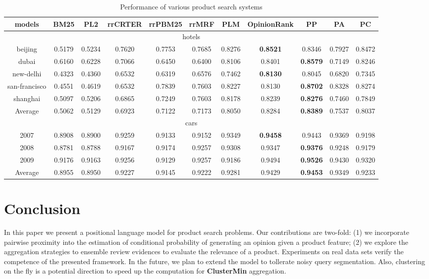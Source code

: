 \documentclass[preprint]{elsarticle}
\begin{document}
\begin{table}
\tiny
\begin{tabular}{|c|c|c|c|c|c|c|c|c|c|c|}
\hline
models &	BM25	&PL2	&rrCRTER	&rrPBM25	&rrMRF	&PLM	&OpinionRank	&PP	&PA	&PC\\\hline
\multicolumn{11}{|c|}{hotels}\\\hline										
beijing &	0.5179 &	0.5234	& 0.7620	& 0.7753	& 0.7685	& 0.8276	& \textbf{0.8521} &	0.8346 &	0.7927 &	0.8472 \\\hline
dubai	& 0.6160	& 0.6228	& 0.7066& 	0.6450	& 0.6400	& 0.8106	& 0.8401& 	\textbf{0.8579}& 	0.7149& 	0.8246\\\hline
new-delhi& 	0.4323& 	0.4360& 	0.6532& 	0.6319& 	0.6576& 	0.7462& 	\textbf{0.8130}& 	0.8045& 	0.6820	& 0.7345\\\hline
san-francisco& 	0.4551	& 0.4619& 	0.6532& 	0.7839	& 0.7603	& 0.8227& 	0.8130	& \textbf{0.8702}	& 0.8328	& 0.8274\\\hline
shanghai& 	0.5097& 	0.5206& 	0.6865& 	0.7249	& 0.7603	& 0.8178& 	0.8239& 	\textbf{0.8276}& 	0.7460& 	0.7849\\\hline
Average & 0.5062	&0.5129	&0.6923	&0.7122&	0.7173&	0.8050&	0.8284	&\textbf{0.8389}&	0.7537&	0.8037 \\\hline
\multicolumn{11}{|c|}{cars}\\\hline											
2007	&0.8908&	0.8900&	0.9259	&0.9133&	0.9152	&0.9349&	\textbf{0.9458}&	0.9443	&0.9369	&0.9198\\\hline
2008&	0.8781&	0.8788&	0.9167&	0.9174&	0.9257	&0.9308&	0.9347&	\textbf{0.9376}	&0.9248&	0.9179\\\hline
2009	&0.9176&	0.9163	&0.9256&	0.9129&	0.9257&	0.9186&	0.9494	&\textbf{0.9526}&	0.9430&	0.9320\\\hline
Average &	0.8955&	0.8950	&0.9227	&0.9145&	0.9222&	0.9281&	0.9429	&\textbf{0.9453}&	0.9349&	0.9233\\\hline
\end{tabular}
\caption{Performance of various product search systems}\label{tab:comparative}
\end{table}



\section{Conclusion}
In this paper we present a positional language model for product search problems. Our contributions are two-fold: (1) we incorporate pairwise proximity into the estimation of conditional probability of generating an opinion given a product feature; (2) we explore the aggregation strategies to ensemble review evidences to evaluate the relevance of a product. Experiments on real data sets verify the competence of the presented framework. In the future, we plan to extend the model to tollerate noisy query segmentation. Also, clustering on the fly is a potential direction to speed up the computation for \textbf{ClusterMin} aggregation. 


%

\end{document}
